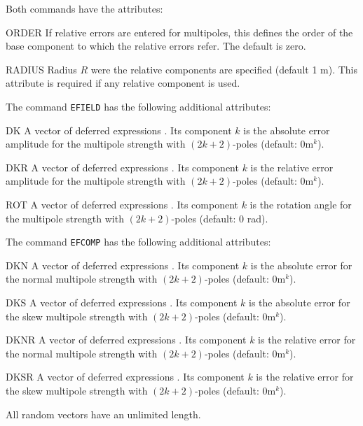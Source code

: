 Both commands have the attributes:
\begin{kdescription}
\item[ORDER]
  If relative errors are entered for multipoles,
  this defines the order of the base component to which the relative
  errors refer.
  The default is zero.
\item[RADIUS]
  Radius $R$ were the relative components are specified (default 1 m).
  This attribute is required if any relative component is used.
\end{kdescription}
The command \texttt{EFIELD} has the following additional attributes:
\begin{kdescription}
\item[DK]
  A {vector}  of deferred expressions .
  Its component $k$ is the absolute error amplitude
  for the multipole strength with $(2k+2)$-poles
  (default: $0 \mathrm{m}^k$).
\item[DKR]
  A {vector}  of deferred expressions .
  Its component $k$ is the relative error amplitude
  for the multipole strength with $(2k+2)$-poles
  (default: $0 \mathrm{m}^k$).
\item[ROT]
  A {vector}  of deferred expressions .
  Its component $k$ is the rotation angle 
  for the multipole strength with $(2k+2)$-poles
  (default: 0 rad).
\end{kdescription}
The command \texttt{EFCOMP} has the following additional attributes:
\begin{kdescription}
\item[DKN]
  A {vector}  of deferred expressions .
  Its component $k$ is the absolute error for the normal multipole
  strength with $(2k+2)$-poles (default: $0 \mathrm{m}^k$).
\item[DKS]
  A {vector}  of deferred expressions .
  Its component $k$ is the absolute error for the skew multipole
  strength with $(2k+2)$-poles (default: $0 \mathrm{m}^k$).
\item[DKNR]
  A {vector}  of deferred expressions .
  Its component $k$ is the relative error for the normal multipole
  strength with $(2k+2)$-poles (default: $0 \mathrm{m}^k$).
\item[DKSR]
  A {vector}  of deferred expressions .
  Its component $k$ is the relative error for the skew multipole
  strength with $(2k+2)$-poles (default: $0 \mathrm{m}^k$).
\end{kdescription}
All random vectors have an unlimited length.


